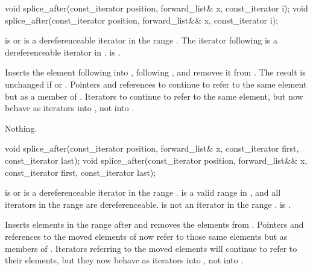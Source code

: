 %
\begin{itemdecl}
void splice_after(const_iterator position, forward_list& x, const_iterator i);
void splice_after(const_iterator position, forward_list&& x, const_iterator i);
\end{itemdecl}

\begin{itemdescr}
\pnum
\expects
{} is  or is a dereferenceable
iterator in the range .
The iterator following  is a dereferenceable iterator in .
 is .

\pnum
\effects
Inserts the element following  into , following
, and removes it from .
The result is unchanged if  or . Pointers
and references to  continue to refer to the same element but as a member of
. Iterators to  continue to refer to
the same element, but now behave as iterators into , not into .

\pnum
\throws
Nothing.

\pnum
\complexity
{}
\end{itemdescr}

%
\begin{itemdecl}
void splice_after(const_iterator position, forward_list& x,
                  const_iterator first, const_iterator last);
void splice_after(const_iterator position, forward_list&& x,
                  const_iterator first, const_iterator last);
\end{itemdecl}

\begin{itemdescr}
\pnum
\expects
{} is  or is a
dereferenceable iterator in the range .  is a
valid range in , and all iterators in the range  are
dereferenceable.  is not an iterator in the range .
 is .

\pnum
\effects
Inserts elements in the range  after  and
removes the elements from . Pointers and references to the moved elements of
 now refer to those same elements but as members of . Iterators
referring to the moved elements will continue to refer to their elements, but they now
behave as iterators into , not into .

\pnum
\complexity
{}
\end{itemdescr}

